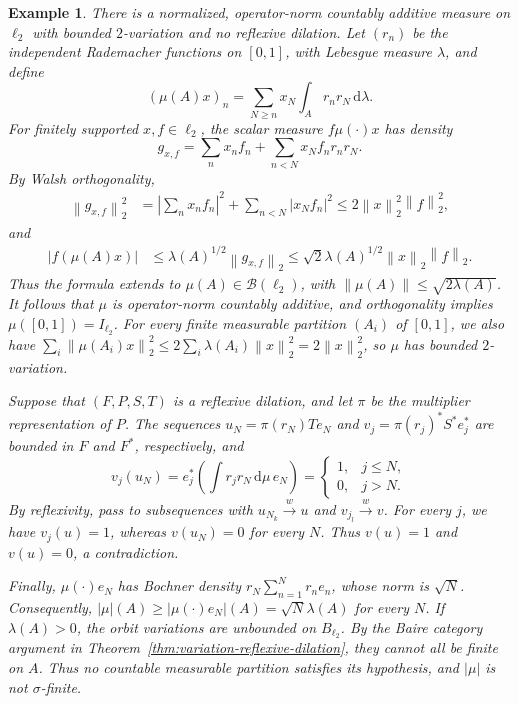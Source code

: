 \documentclass[11pt,leqno]{amsart}
\theoremstyle{compact}
\numberwithin{equation}{section}
\theoremstyle{compactremark}
\newtheorem{example}[theorem]{Example}
\theoremstyle{compact}
\newcommand{\1}{\mathbbm{1}}
\newcommand{\rmd}{\mathrm{d}}
\newcommand{\cB}{\mathcal{B}}
\newcommand{\norm}[1]{\left\|#1\right\|}
\newcommand{\abs}[1]{\left|#1\right|}
\begin{document}
\begin{example}\label{ex:no-reflexive-dilation}
There is a normalized, operator-norm countably additive measure on $\ell_2$ with bounded $2$-variation and no reflexive dilation. Let $(r_n)$ be the independent Rademacher functions on $[0,1]$, with Lebesgue measure $\lambda$, and define
\[
(\mu(A)x)_n=\sum_{N\geq n}x_N\int_A r_nr_N\,\rmd\lambda.
\]
For finitely supported $x,f\in\ell_2$, the scalar measure $f\mu(\cdot)x$ has density
\[
g_{x,f}=\sum_nx_nf_n+\sum_{n<N}x_Nf_nr_nr_N.
\]
By Walsh orthogonality,
\begin{align*}
\norm{g_{x,f}}_2^2
&=\abs{\sum_nx_nf_n}^2+\sum_{n<N}\abs{x_Nf_n}^2
  \leq2\norm{x}_2^2\norm{f}_2^2,
\end{align*}
and
\begin{align*}
\abs{f(\mu(A)x)}
&\leq\lambda(A)^{1/2}\norm{g_{x,f}}_2
  \leq\sqrt2\lambda(A)^{1/2}\norm{x}_2\norm{f}_2.
\end{align*}
Thus the formula extends to $\mu(A)\in\cB(\ell_2)$, with $\norm{\mu(A)}\leq\sqrt{2\lambda(A)}$. It follows that $\mu$ is operator-norm countably additive, and orthogonality implies $\mu([0,1])=I_{\ell_2}$. For every finite measurable partition $(A_i)$ of $[0,1]$, we also have $\sum_i\norm{\mu(A_i)x}_2^2\leq2\sum_i\lambda(A_i)\norm{x}_2^2=2\norm{x}_2^2$, so $\mu$ has bounded $2$-variation.

Suppose that $(F,P,S,T)$ is a reflexive dilation, and let $\pi$ be the multiplier representation of $P$. The sequences $u_N=\pi(r_N)Te_N$ and $v_j=\pi(r_j)^*S^*e_j^*$ are bounded in $F$ and $F^*$, respectively, and
\[
v_j(u_N)=e_j^*\left(\int r_jr_N\,\rmd\mu\,e_N\right)
=\begin{cases}1,&j\leq N,\\0,&j>N.\end{cases}
\]
By reflexivity, pass to subsequences with $u_{N_k}\xrightarrow{w} u$ and $v_{j_l}\xrightarrow{w} v$. For every $j$, we have $v_j(u)=1$, whereas $v(u_N)=0$ for every $N$. Thus $v(u)=1$ and $v(u)=0$, a contradiction.

Finally, $\mu(\cdot)e_N$ has Bochner density $r_N\sum_{n=1}^Nr_ne_n$, whose norm is $\sqrt N$. Consequently, $\abs{\mu}(A)\geq\abs{\mu(\cdot)e_N}(A)=\sqrt N\lambda(A)$ for every $N$. If $\lambda(A)>0$, the orbit variations are unbounded on $B_{\ell_2}$. By the Baire category argument in Theorem~\ref{thm:variation-reflexive-dilation}, they cannot all be finite on $A$. Thus no countable measurable partition satisfies its hypothesis, and $\abs{\mu}$ is not $\sigma$-finite.
\end{example}
\end{document}
